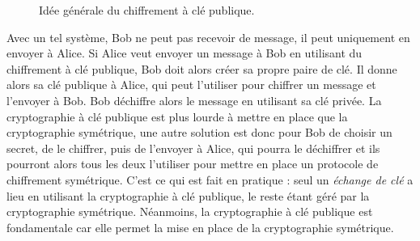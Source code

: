 \begin{figure}[h]
  \caption{Idée générale du chiffrement à clé publique.}
  \label{fig:crypto-asym}
\end{figure}
Avec un tel système, Bob ne peut pas recevoir de message, il peut uniquement en
envoyer à Alice. Si Alice veut envoyer un message à Bob en utilisant du
chiffrement à clé publique, Bob doit alors créer sa propre paire de clé. Il
donne alors sa clé publique à Alice, qui peut l'utiliser pour chiffrer un
message et l'envoyer à Bob. Bob déchiffre alors le message en utilisant sa clé
privée. La cryptographie à clé publique est plus lourde à mettre en place que la
cryptographie symétrique, une autre solution est donc pour Bob de choisir un
secret, de le chiffrer, puis de l'envoyer à Alice, qui pourra le déchiffrer et
ils pourront alors tous les deux l'utiliser pour mettre en place un protocole de
chiffrement symétrique. C'est ce qui est fait en pratique : seul un
\emph{échange de clé} a lieu en utilisant la cryptographie à clé publique, le
reste étant géré par la cryptographie symétrique. Néanmoins, la cryptographie à
clé publique est fondamentale car elle permet la mise en place de la
cryptographie symétrique.

